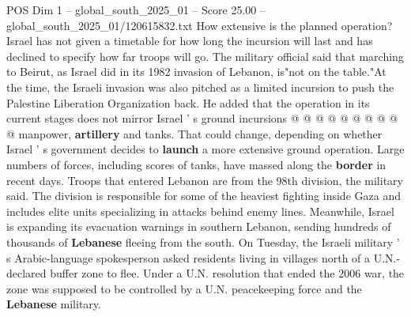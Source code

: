 \begin{textsample}{POS Dim 1 – global\_south\_2025\_01 – Score 25.00 – global\_south\_2025\_01/120615832.txt}
How extensive is the planned operation?
Israel has not given a timetable for how long the incursion will last and has declined to specify how far troops will go.
The military official said that marching to Beirut, as Israel did in its 1982 invasion of Lebanon, is"not on the table."At the time, the Israeli invasion was also pitched as a limited incursion to push the Palestine Liberation Organization back.
He added that the operation in its current stages does not mirror Israel ' s ground incursions @ @ @ @ @ @ @ @ @ @ manpower, \textbf{artillery} and tanks.
That could change, depending on whether Israel ' s government decides to \textbf{launch} a more extensive ground operation.
Large numbers of forces, including scores of tanks, have massed along the \textbf{border} in recent days.
Troops that entered Lebanon are from the 98th division, the military said.
The division is responsible for some of the heaviest fighting inside Gaza and includes elite units specializing in attacks behind enemy lines.
Meanwhile, Israel is expanding its evacuation warnings in southern Lebanon, sending hundreds of thousands of \textbf{Lebanese} fleeing from the south.
On Tuesday, the Israeli military ' s Arabic-language spokesperson asked residents living in villages north of a U.N.-declared buffer zone to flee.
Under a U.N. resolution that ended the 2006 war, the zone was supposed to be controlled by a U.N. peacekeeping force and the \textbf{Lebanese} military.

\end{textsample}
